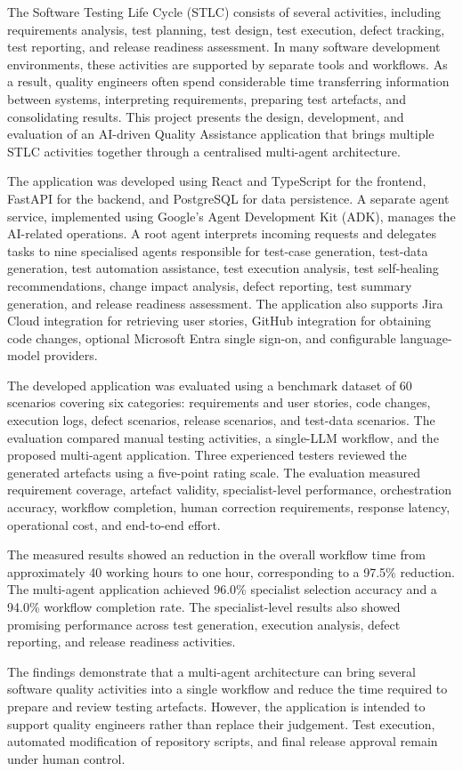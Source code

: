 The Software Testing Life Cycle (STLC) consists of several activities, including requirements analysis, test planning, test design, test execution, defect tracking, test reporting, and release readiness assessment. In many software development environments, these activities are supported by separate tools and workflows. As a result, quality engineers often spend considerable time transferring information between systems, interpreting requirements, preparing test artefacts, and consolidating results. This project presents the design, development, and evaluation of an AI-driven Quality Assistance application that brings multiple STLC activities together through a centralised multi-agent architecture.

The application was developed using React and TypeScript for the frontend, FastAPI for the backend, and PostgreSQL for data persistence. A separate agent service, implemented using Google’s Agent Development Kit (ADK), manages the AI-related operations. A root agent interprets incoming requests and delegates tasks to nine specialised agents responsible for test-case generation, test-data generation, test automation assistance, test execution analysis, test self-healing recommendations, change impact analysis, defect reporting, test summary generation, and release readiness assessment. The application also supports Jira Cloud integration for retrieving user stories, GitHub integration for obtaining code changes, optional Microsoft Entra single sign-on, and configurable language-model providers.

The developed application was evaluated using a benchmark dataset of 60 scenarios covering six categories: requirements and user stories, code changes, execution logs, defect scenarios, release scenarios, and test-data scenarios. The evaluation compared manual testing activities, a single-LLM workflow, and the proposed multi-agent application. Three experienced testers reviewed the generated artefacts using a five-point rating scale. The evaluation measured requirement coverage, artefact validity, specialist-level performance, orchestration accuracy, workflow completion, human correction requirements, response latency, operational cost, and end-to-end effort.

The measured results showed an reduction in the overall workflow time from approximately 40 working hours to one hour, corresponding to a 97.5\% reduction. The multi-agent application achieved 96.0\% specialist selection accuracy and a 94.0\% workflow completion rate. The specialist-level results also showed promising performance across test generation, execution analysis, defect reporting, and release readiness activities.

The findings demonstrate that a multi-agent architecture can bring several software quality activities into a single workflow and reduce the time required to prepare and review testing artefacts. However, the application is intended to support quality engineers rather than replace their judgement. Test execution, automated modification of repository scripts, and final release approval remain under human control.
